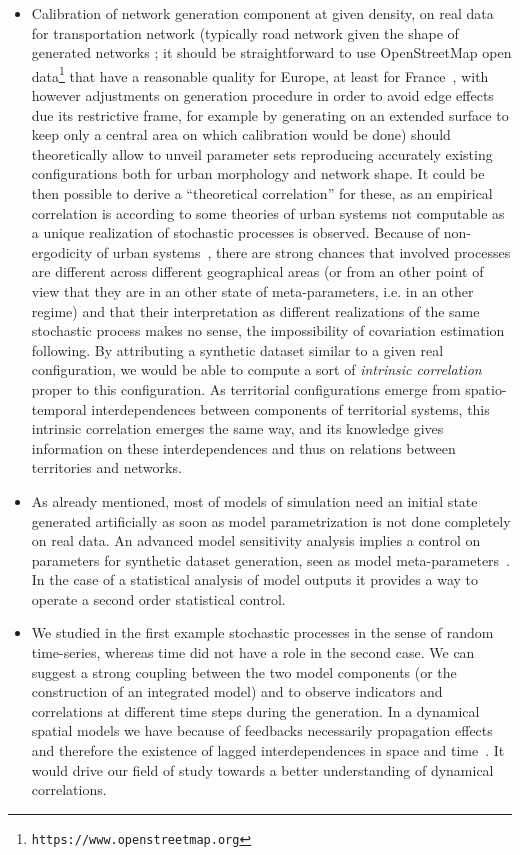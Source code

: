 \begin{itemize}
\item Calibration of network generation component at given density, on real data for transportation network (typically road network given the shape of generated networks ; it should be straightforward to use OpenStreetMap open data\footnote{\texttt{https://www.openstreetmap.org}} that have a reasonable quality for Europe, at least for France~\cite{girres2010quality}, with however adjustments on generation procedure in order to avoid edge effects due its restrictive frame, for example by generating on an extended surface to keep only a central area on which calibration would be done) should theoretically allow to unveil parameter sets reproducing accurately existing configurations both for urban morphology and network shape. It could be then possible to derive a ``theoretical correlation'' for these, as an empirical correlation is according to some theories of urban systems not computable as a unique realization of stochastic processes is observed. Because of non-ergodicity of urban systems~\cite{pumain2012urban}, there are strong chances that involved processes are different across different geographical areas (or from an other point of view that they are in an other state of meta-parameters, i.e. in an other regime) and that their interpretation as different realizations of the same stochastic process makes no sense, the impossibility of covariation estimation following. By attributing a synthetic dataset similar to a given real configuration, we would be able to compute a sort of \emph{intrinsic correlation} proper to this configuration. As territorial configurations emerge from spatio-temporal interdependences between components of territorial systems, this intrinsic correlation emerges the same way, and its knowledge gives information on these interdependences and thus on relations between territories and networks.
\item As already mentioned, most of models of simulation need an initial state generated artificially as soon as model parametrization is not done completely on real data. An advanced model sensitivity analysis implies a control on parameters for synthetic dataset generation, seen as model meta-parameters~\cite{cottineau2015revisiting}. In the case of a statistical analysis of model outputs it provides a way to operate a second order statistical control.
\item We studied in the first example stochastic processes in the sense of random time-series, whereas time did not have a role in the second case. We can suggest a strong coupling between the two model components (or the construction of an integrated model) and to observe indicators and correlations at different time steps during the generation. In a dynamical spatial models we have because of feedbacks necessarily propagation effects and therefore the existence of lagged interdependences in space and time~\cite{pigozzi1980interurban}. It would drive our field of study towards a better understanding of dynamical correlations.
\end{itemize}


